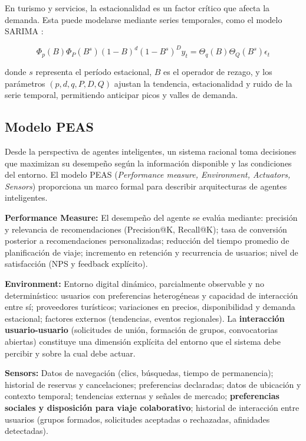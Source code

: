 \documentclass[12pt, letterpaper]{article}
\begin{document}
En turismo y servicios, la estacionalidad es un factor crítico que afecta la demanda. Esta puede modelarse mediante series temporales, como el modelo SARIMA \citep{ref10}:

\begin{equation}
\Phi_p(B)\Phi_P(B^s)(1-B)^d(1-B^s)^D y_t = \Theta_q(B)\Theta_Q(B^s)\epsilon_t
\end{equation}

donde $s$ representa el período estacional, $B$ es el operador de rezago, y los parámetros $(p,d,q,P,D,Q)$ ajustan la tendencia, estacionalidad y ruido de la serie temporal, permitiendo anticipar picos y valles de demanda.

\subsection{Modelo PEAS}

Desde la perspectiva de agentes inteligentes, un sistema racional toma decisiones que maximizan su desempeño según la información disponible y las condiciones del entorno. El modelo PEAS (\textit{Performance measure, Environment, Actuators, Sensors}) proporciona un marco formal para describir arquitecturas de agentes inteligentes.

\textbf{Performance Measure:} El desempeño del agente se evalúa mediante: precisión y relevancia de recomendaciones (Precision@K, Recall@K); tasa de conversión posterior a recomendaciones personalizadas; reducción del tiempo promedio de planificación de viaje; incremento en retención y recurrencia de usuarios; nivel de satisfacción (NPS y feedback explícito).

\textbf{Environment:} Entorno digital dinámico, parcialmente observable y no determinístico: usuarios con preferencias heterogéneas y capacidad de interacción entre sí; proveedores turísticos; variaciones en precios, disponibilidad y demanda estacional; factores externos (tendencias, eventos regionales). La \textbf{interacción usuario-usuario} (solicitudes de unión, formación de grupos, convocatorias abiertas) constituye una dimensión explícita del entorno que el sistema debe percibir y sobre la cual debe actuar.

\textbf{Sensors:} Datos de navegación (clics, búsquedas, tiempo de permanencia); historial de reservas y cancelaciones; preferencias declaradas; datos de ubicación y contexto temporal; tendencias externas y señales de mercado; \textbf{preferencias sociales y disposición para viaje colaborativo}; historial de interacción entre usuarios (grupos formados, solicitudes aceptadas o rechazadas, afinidades detectadas).
\end{document}
